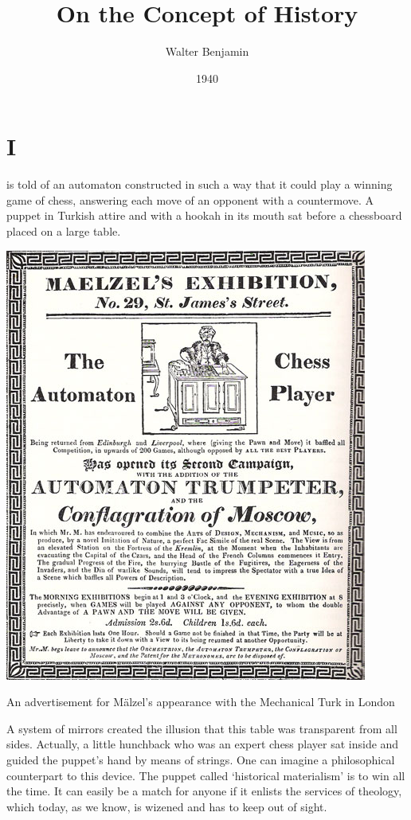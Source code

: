 \documentclass[12pt]{tufte-handout}
\title{On the Concept of History}
\author{Walter Benjamin}
\date{1940}  %
\begin{document}
\maketitle%


\section{I}\label{sec:I}

 is told of an automaton constructed in such a way that it could play a winning game of chess, answering each move of an opponent with a countermove. A puppet in Turkish attire and with a hookah in its mouth sat before a chessboard placed on a large table.
\begin{marginfigure}%
  \includegraphics[width=\linewidth]{graphics/Henkin12.jpg}
  \caption{An advertisement for M\"alzel's appearance with the Mechanical Turk in London}
  \label{fig:turk}
\end{marginfigure}
A system of mirrors created the illusion that this table was transparent from all sides. Actually, a little hunchback who was an expert chess player sat inside and guided the puppet’s hand by means of strings. One can imagine a philosophical counterpart to this device. The puppet called ‘historical materialism’ is to win all the time. It can easily be a match for anyone if it enlists the services of theology, which today, as we know, is wizened and has to keep out of sight. 	
\end{document}

